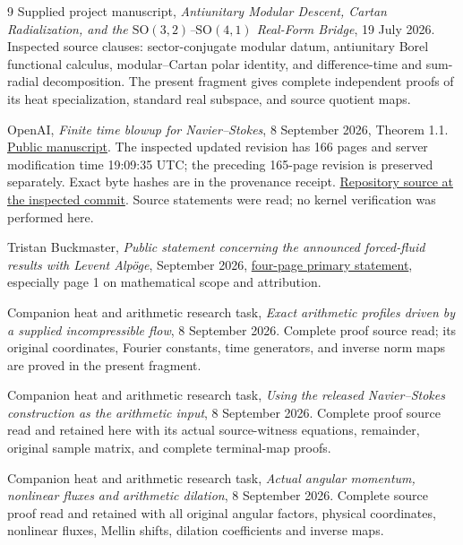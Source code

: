 \documentclass[11pt,a4paper]{article}
\theoremstyle{definition}
\theoremstyle{plain}
\begin{document}
\begin{thebibliography}{9}
Supplied project manuscript,
\emph{Antiunitary Modular Descent, Cartan Radialization, and the
$\mathrm{SO}(3,2)$--$\mathrm{SO}(4,1)$ Real-Form Bridge},
19 July 2026.
Inspected source clauses: sector-conjugate modular datum,
antiunitary Borel functional calculus, modular--Cartan polar identity,
and difference-time and sum-radial decomposition.
The present fragment gives complete independent proofs of its
heat specialization, standard real subspace, and source quotient maps.

OpenAI, \emph{Finite time blowup for Navier--Stokes},
8 September 2026, Theorem 1.1.
\href{https://cdn.openai.com/pdf/32d9f210-8b73-45e0-91bc-82a30aef8a9a/navier-stokes.pdf}{Public manuscript}.
The inspected updated revision has 166 pages and server modification
time 19:09:35 UTC; the preceding 165-page revision is preserved
separately. Exact byte hashes are in the provenance receipt.
\href{https://github.com/openai/NavierStokesAndEuler/tree/8937a8f4cbc7abaab5e9e97d1cc7f5d2319d9538}{Repository source at the inspected commit}.
Source statements were read; no kernel verification was performed here.

Tristan Buckmaster, \emph{Public statement concerning the announced
forced-fluid results with Levent Alp\"oge}, September 2026,
\href{https://cims.nyu.edu/~tristanb/statement.pdf}{four-page primary statement},
especially page 1 on mathematical scope and attribution.

Companion heat and arithmetic research task,
\emph{Exact arithmetic profiles driven by a supplied incompressible flow},
8 September 2026. Complete proof source read; its original coordinates,
Fourier constants, time generators, and inverse norm maps are
proved in the present fragment.

Companion heat and arithmetic research task,
\emph{Using the released Navier--Stokes construction as the arithmetic input},
8 September 2026. Complete proof source read and retained here with
its actual source-witness equations, remainder, original sample
matrix, and complete terminal-map proofs.

Companion heat and arithmetic research task,
\emph{Actual angular momentum, nonlinear fluxes and arithmetic dilation},
8 September 2026. Complete source proof read and retained with all
original angular factors, physical coordinates, nonlinear fluxes,
Mellin shifts, dilation coefficients and inverse maps.


\end{thebibliography}
\end{document}
